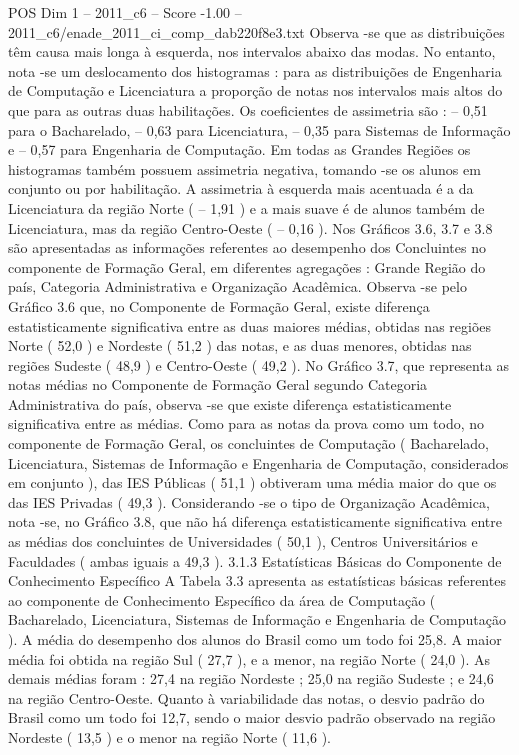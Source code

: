 \begin{textsample}{POS Dim 1 – 2011\_c6 – Score -1.00 – 2011\_c6/enade\_2011\_ci\_comp\_dab220f8e3.txt}
Observa -se que as distribuições têm causa mais longa à esquerda, nos intervalos abaixo das modas.
No entanto, nota -se um deslocamento dos histogramas : para as distribuições de Engenharia de Computação e Licenciatura a proporção de notas nos intervalos mais altos do que para as outras duas habilitações.
Os coeficientes de assimetria são : – 0,51 para o Bacharelado, – 0,63 para Licenciatura, – 0,35 para Sistemas de Informação e – 0,57 para Engenharia de Computação.
Em todas as Grandes Regiões os histogramas também possuem assimetria negativa, tomando -se os alunos em conjunto ou por habilitação.
A assimetria à esquerda mais acentuada é a da Licenciatura da região Norte ( – 1,91 ) e a mais suave é de alunos também de Licenciatura, mas da região Centro-Oeste ( – 0,16 ).
Nos Gráficos 3.6, 3.7 e 3.8 são apresentadas as informações referentes ao desempenho dos Concluintes no componente de Formação Geral, em diferentes agregações : Grande Região do país, Categoria Administrativa e Organização Acadêmica.
Observa -se pelo Gráfico 3.6 que, no Componente de Formação Geral, existe diferença estatisticamente significativa entre as duas maiores médias, obtidas nas regiões Norte ( 52,0 ) e Nordeste ( 51,2 ) das notas, e as duas menores, obtidas nas regiões Sudeste ( 48,9 ) e Centro-Oeste ( 49,2 ).
No Gráfico 3.7, que representa as notas médias no Componente de Formação Geral segundo Categoria Administrativa do país, observa -se que existe diferença estatisticamente significativa entre as médias.
Como para as notas da prova como um todo, no componente de Formação Geral, os concluintes de Computação ( Bacharelado, Licenciatura, Sistemas de Informação e Engenharia de Computação, considerados em conjunto ), das IES Públicas ( 51,1 ) obtiveram uma média maior do que os das IES Privadas ( 49,3 ).
Considerando -se o tipo de Organização Acadêmica, nota -se, no Gráfico 3.8, que não há diferença estatisticamente significativa entre as médias dos concluintes de Universidades ( 50,1 ), Centros Universitários e Faculdades ( ambas iguais a 49,3 ). 3.1.3 Estatísticas Básicas do Componente de Conhecimento Específico A Tabela 3.3 apresenta as estatísticas básicas referentes ao componente de Conhecimento Específico da área de Computação ( Bacharelado, Licenciatura, Sistemas de Informação e Engenharia de Computação ).
A média do desempenho dos alunos do Brasil como um todo foi 25,8.
A maior média foi obtida na região Sul ( 27,7 ), e a menor, na região Norte ( 24,0 ).
As demais médias foram : 27,4 na região Nordeste ; 25,0 na região Sudeste ; e 24,6 na região Centro-Oeste.
Quanto à variabilidade das notas, o desvio padrão do Brasil como um todo foi 12,7, sendo o maior desvio padrão observado na região Nordeste ( 13,5 ) e o menor na região Norte ( 11,6 ).

\end{textsample}
